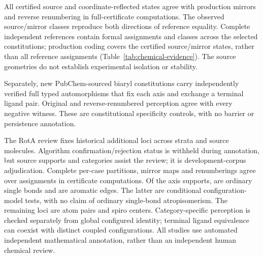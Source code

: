 \documentclass[pdflatex,sn-mathphys-num,referee,lineno]{sn-jnl}
\theoremstyle{plain}
\theoremstyle{remark}
\theoremstyle{definition}
\begin{document}
All certified source and coordinate-reflected states agree with production
mirrors and reverse renumbering in \ChemicalCoordinationCodeComputations{}
full-certificate computations. The observed \ChemicalCoordinationObservedSourceMirrorClasses{}
source/mirror classes reproduce both directions of reference equality.
Complete independent references contain \ChemicalCoordinationReferenceAssignments{}
formal assignments and \ChemicalCoordinationReferenceClasses{} classes across
the selected constitutions; production coding covers the certified source/mirror
states, rather than all reference assignments (Table~\ref{tab:chemical-evidence}).
The source geometries do not establish experimental isolation or stability.

Separately, \ChemicalNegativeSelected{} new PubChem-sourced biaryl constitutions
carry independently verified full typed automorphisms that fix each axis and
exchange a terminal ligand pair. Original and reverse-renumbered perception
agree with every negative witness. These are constitutional specificity
controls, with no barrier or persistence annotation.

The RotA review fixes \ChemicalRotASelected{} historical additional loci across
\ChemicalRotAStrata{} strata and \ChemicalRotASourceRecords{} source molecules.
Algorithm confirmation/rejection status is withheld during annotation, but
source supports and categories assist the review; it is development-corpus
adjudication. Complete per-case partitions, mirror maps and renumberings agree
over \ChemicalRotAFormalAssignments{} assignments in
\ChemicalRotACodeComputations{} certificate computations. Of the
\ChemicalRotAAxisSupports{} axis supports, \ChemicalRotAOrdinarySingleBondAxes{}
are ordinary single bonds and \ChemicalRotAAromaticAxes{} are aromatic edges.
The latter are conditional configuration-model tests, with no claim of
ordinary single-bond atropisomerism. The remaining loci are
\ChemicalRotATetrahedralPairs{} atom pairs and \ChemicalRotASpiroCenters{}
spiro centers. Category-specific perception is checked separately from global
configured identity; terminal ligand equivalence can coexist with distinct
coupled configurations. All studies use automated independent mathematical
annotation, rather than an independent human chemical review.
\end{document}

